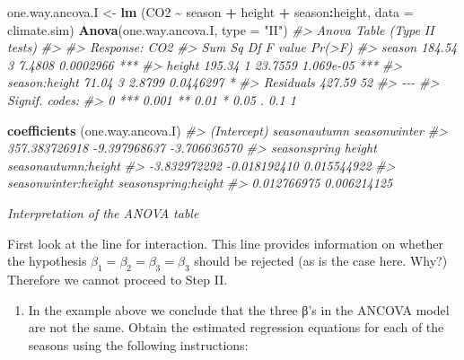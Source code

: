 \documentclass[
]{book}
\newenvironment{Shaded}{\begin{snugshade}}{\end{snugshade}}
\newcommand{\AttributeTok}[1]{\textcolor[rgb]{0.13,0.29,0.53}{#1}}
\newcommand{\CommentTok}[1]{\textcolor[rgb]{0.56,0.35,0.01}{\textit{#1}}}
\newcommand{\FunctionTok}[1]{\textcolor[rgb]{0.13,0.29,0.53}{\textbf{#1}}}
\newcommand{\NormalTok}[1]{#1}
\newcommand{\OtherTok}[1]{\textcolor[rgb]{0.56,0.35,0.01}{#1}}
\newcommand{\SpecialCharTok}[1]{\textcolor[rgb]{0.81,0.36,0.00}{\textbf{#1}}}
\newcommand{\StringTok}[1]{\textcolor[rgb]{0.31,0.60,0.02}{#1}}
\providecommand{\tightlist}{%
  \setlength{\itemsep}{0pt}\setlength{\parskip}{0pt}}
\begin{document}
\begin{Shaded}
\begin{Highlighting}[]
\NormalTok{one.way.ancova.I }\OtherTok{\textless{}{-}} \FunctionTok{lm}\NormalTok{ (CO2 }\SpecialCharTok{\textasciitilde{}}\NormalTok{ season }\SpecialCharTok{+}\NormalTok{ height }\SpecialCharTok{+}\NormalTok{ season}\SpecialCharTok{:}\NormalTok{height, }
                        \AttributeTok{data =}\NormalTok{ climate.sim)}
\FunctionTok{Anova}\NormalTok{(one.way.ancova.I, }\AttributeTok{type =} \StringTok{"II"}\NormalTok{)}
\CommentTok{\#\textgreater{} Anova Table (Type II tests)}
\CommentTok{\#\textgreater{} }
\CommentTok{\#\textgreater{} Response: CO2}
\CommentTok{\#\textgreater{}               Sum Sq Df F value    Pr(\textgreater{}F)    }
\CommentTok{\#\textgreater{} season        184.54  3  7.4808 0.0002966 ***}
\CommentTok{\#\textgreater{} height        195.34  1 23.7559 1.069e{-}05 ***}
\CommentTok{\#\textgreater{} season:height  71.04  3  2.8799 0.0446297 *  }
\CommentTok{\#\textgreater{} Residuals     427.59 52                      }
\CommentTok{\#\textgreater{} {-}{-}{-}}
\CommentTok{\#\textgreater{} Signif. codes:  }
\CommentTok{\#\textgreater{} 0 \textquotesingle{}***\textquotesingle{} 0.001 \textquotesingle{}**\textquotesingle{} 0.01 \textquotesingle{}*\textquotesingle{} 0.05 \textquotesingle{}.\textquotesingle{} 0.1 \textquotesingle{} \textquotesingle{} 1}

\FunctionTok{coefficients}\NormalTok{ (one.way.ancova.I)}
\CommentTok{\#\textgreater{}         (Intercept)        seasonautumn        seasonwinter }
\CommentTok{\#\textgreater{}       357.383726918        {-}9.397968637        {-}3.706636570 }
\CommentTok{\#\textgreater{}        seasonspring              height seasonautumn:height }
\CommentTok{\#\textgreater{}        {-}3.832972292        {-}0.018192410         0.015544922 }
\CommentTok{\#\textgreater{} seasonwinter:height seasonspring:height }
\CommentTok{\#\textgreater{}         0.012766975         0.006214125}
\end{Highlighting}
\end{Shaded}

\emph{Interpretation of the ANOVA table}

First look at the line for interaction. This line provides information on whether the hypothesis \(\beta_1 = \beta_2 = \beta_3 = \beta_3\) should be rejected (as is the case here. Why?) Therefore we cannot proceed to Step II.

\begin{enumerate}
\def\labelenumi{(\roman{enumi})}
\tightlist
\item
  In the example above we conclude that the three β's in the ANCOVA model are not the same. Obtain the estimated regression equations for each of the seasons using the following instructions:
\end{enumerate}
\end{document}
